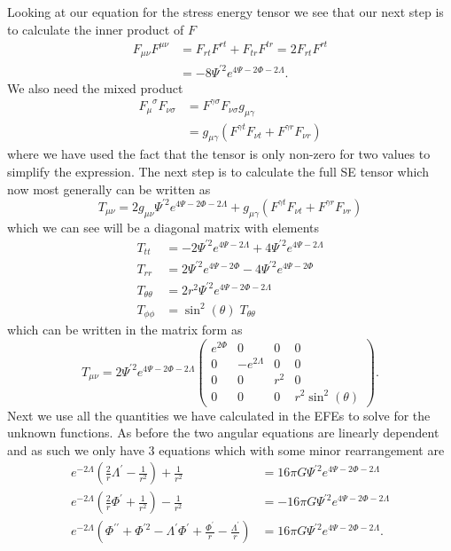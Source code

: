 \documentclass[12pt]{article}
\numberwithin{equation}{section}
\numberwithin{figure}{section}
\begin{document}
Looking at our equation for the stress energy tensor we see that our next step is to calculate the inner product of $F$
\begin{align}
	F_{\mu\nu}F^{\mu\nu}&=F_{rt}F^{rt}+F_{tr}F^{tr}=2F_{rt}F^{rt}\\
	&=-8\Psi ^{\prime 2} e^{4\Psi-2\Phi-2\Lambda}.
\end{align}
We also need the mixed product
\begin{align}
	{F_{\mu}}^{\sigma} F_{\nu\sigma}&= F^{\gamma\sigma}F_{\nu\sigma}g_{\mu\gamma}\\
	&=g_{\mu\gamma}\left(F^{\gamma t}F_{\nu t}+ F^{\gamma r}F_{\nu r}\right)
\end{align}
where we have used the fact that the tensor is only non-zero for two values to simplify the expression. The next step is to calculate the full SE tensor which now most generally can be written as
\begin{equation}
	T_{\mu\nu}= 2g_{\mu\nu}\Psi ^{\prime 2} e^{4\Psi-2\Phi-2\Lambda} +g_{\mu\gamma}\left(F^{\gamma t}F_{\nu t}+ F^{\gamma r}F_{\nu r}\right)
\end{equation}
which we can see will be a diagonal matrix with elements
\begin{align}
	T_{tt}&=-2\Psi ^{\prime 2} e^{4\Psi-2\Lambda} +4\Psi ^{\prime 2} e^{4\Psi-2\Lambda}\\
	T_{rr}&=2 \Psi ^{\prime 2} e^{4\Psi-2\Phi} -4 \Psi ^{\prime 2} e^{4\Psi-2\Phi}\\
	T_{\theta\theta}&=2r^{2} \Psi ^{\prime 2} e^{4\Psi-2\Phi-2\Lambda}\\
	T_{\phi\phi}&= \sin^2(\theta) \;T_{\theta\theta}
\end{align}
which can be written in the matrix form as
\begin{equation}
	T_{\mu\nu} = 
		2 \Psi ^{\prime 2} e^{4\Psi-2\Phi-2\Lambda} \begin{pmatrix}
		e^{2\Phi} & 0 & 0 & 0 \\
		0 & -e^{2\Lambda} & 0 & 0 \\
		0 & 0 & r^{2} & 0 \\
		0 & 0 & 0 & r^{2}\sin^{2}(\theta)
	\end{pmatrix}.
\end{equation}
Next we use all the quantities we have calculated in the EFEs to solve for the unknown functions. As before the two angular equations are linearly dependent and as such we only have 3 equations which with some minor rearrangement are
\begin{align}
	e^{-2\Lambda}\left(\frac{2}{r}\Lambda^\prime - \frac{1}{r^2}\right) +\frac{1}{r^2}&= 16\pi G \Psi ^{\prime 2} e^{4\Psi-2\Phi-2\Lambda}\label{eq:charged_efe_1}\\
	e^{-2\Lambda}\left(\frac{2}{r}\Phi^\prime + \frac{1}{r^2}\right) - \frac{1}{r^2} &=-16\pi G \Psi ^{\prime 2} e^{4\Psi-2\Phi-2\Lambda}\\
	e^{-2\Lambda}\left(\Phi^{\prime\prime}+\Phi^{\prime2}-\Lambda^\prime\Phi^\prime +\frac{\Phi^\prime}{r}- \frac{\Lambda^\prime}{r}\right)&=16\pi G \Psi ^{\prime 2} e^{4\Psi-2\Phi-2\Lambda}.
\end{align}
\end{document}
